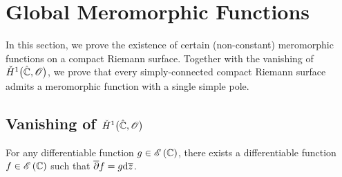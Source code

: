 \documentclass[../Moduli_Spaces_of_Riemann_Surfaces.tex]{subfiles}
\begin{document}
    \section{Global Meromorphic Functions}\label{CC:sec:global_meromorphic_functions}
    In this section, we prove the existence of certain (non-constant) meromorphic functions on a compact Riemann surface. Together with the vanishing of $\check{H}^1\big(\hat{\mathbb{C}},\mathscr{O}\big)$, we prove that every simply-connected compact Riemann surface admits a meromorphic function with a single simple pole.
    \subsection{Vanishing of $\check{H}^1\big(\hat{\mathbb{C}},\mathscr{O}\big)$}
    \begin{theorem}[Dolbeault]
        For any differentiable function $g\in\mathscr{E}\left(\mathbb{C}\right)$, there exists a differentiable function $f\in\mathscr{E}\left(\mathbb{C}\right)$ such that $\overline{\partial}f=g\mathrm{d}\overline{z}$.
    \end{theorem}
\end{document}
